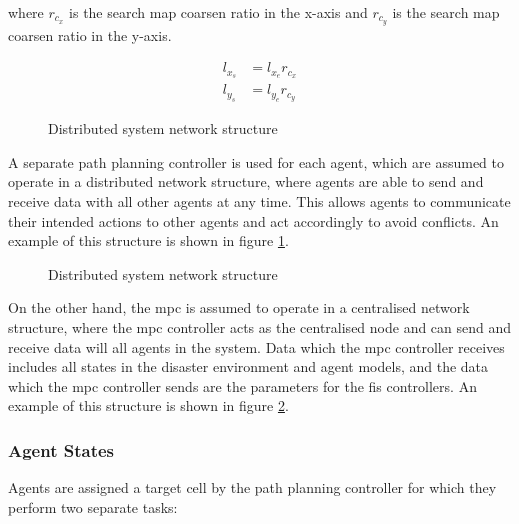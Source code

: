 \documentclass[conference]{IEEEtran}
\begin{document}
where $r_{c_{x}}$ is the search map coarsen ratio in the x-axis and $r_{c_{y}}$ is the search map coarsen ratio in the y-axis.

\begin{equation}
    \begin{split}
        \label{eq:cellLengthRelation}
        l_{x_{s}} &= l_{x_{e}} r_{c_{x}} \\
        l_{y_{s}} &= l_{y_{e}} r_{c_{y}}
    \end{split}
\end{equation}

\begin{figure}
    \centering
    
    \caption{Distributed system network structure}
    \label{fig:diagram_network_distributed}
\end{figure}

A separate path planning controller is used for each agent, which are assumed to operate in a distributed network structure, where agents are able to send and receive data with all other agents at any time.
This allows agents to communicate their intended actions to other agents and act accordingly to avoid conflicts.
An example of this structure is shown in figure \ref{fig:diagram_network_distributed}.

\begin{figure}
    \centering
    
    \caption{Distributed system network structure}
    \label{fig:diagram_network_centralised}
\end{figure}

On the other hand, the \gls{mpc} is assumed to operate in a centralised network structure, where the \gls{mpc} controller acts as the centralised node and can send and receive data will all agents in the system.
Data which the \gls{mpc} controller receives includes all states in the disaster environment and agent models, and the data which the \gls{mpc} controller sends are the parameters for the \gls{fis} controllers.
An example of this structure is shown in figure \ref{fig:diagram_network_centralised}.

\subsubsection{Agent States}

Agents are assigned a target cell by the path planning controller for which they perform two separate tasks:
\end{document}
